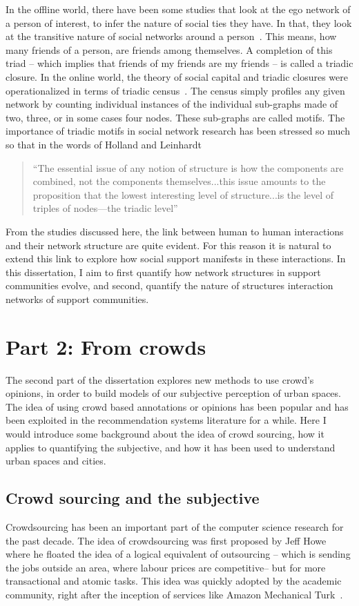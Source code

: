 In the offline world, there have been some studies that look at the ego network of a person of interest, to infer the nature of social ties they have. In that, they look at the transitive nature of social networks around a person~\cite{golden2009social,doi:10.1177/104649647100200201, lin2001social}. This means, how many friends of a person, are friends among themselves. A completion of this triad -- which implies that friends of my friends are my friends -- is called a triadic closure.
In the online world, the theory of social capital and triadic closures were operationalized in terms of triadic census~\cite{faust20077,faust2008triadic}. The census simply profiles any given network by counting individual instances of the individual sub-graphs made of two, three, or in some cases four nodes. These sub-graphs are called motifs.
The importance of triadic motifs in social network research has been stressed so much so that in the words of  Holland and Leinhardt~\cite{holland1977method} 
\begin{quote}
    ``The essential issue of any notion of structure is how the components are combined, not the components themselves...this issue amounts to the proposition that the lowest interesting level of structure...is the level of triples of nodes—the triadic level''
\end{quote}


From the studies discussed here, the link between human to human interactions and their network structure are quite evident. For this reason it is natural to extend this link to explore how social support manifests in these interactions. In this dissertation, I aim to first quantify how network structures in support communities evolve, and second, quantify the nature of structures interaction networks of support communities. 

\section{Part 2: From crowds}
The second part of the dissertation explores new methods to use crowd's opinions, in order to build models of our subjective perception of urban spaces. The idea of using crowd based annotations or opinions has been popular and has been exploited in the recommendation systems literature for a while. Here I would introduce some background about the idea of crowd sourcing, how it applies to quantifying the subjective, and how it has been used to understand urban spaces and cities. 

\subsection{Crowd sourcing and the subjective}
Crowdsourcing has been an important part of the computer science research for the past decade. The idea of crowdsourcing was first proposed by Jeff Howe~\cite{howe2006rise} where he floated the  idea of a logical equivalent of outsourcing -- which is sending the jobs outside an area, where labour prices are competitive-- but for more transactional and atomic tasks. This idea was quickly adopted by the academic community, right after the inception of services like Amazon Mechanical Turk~\cite{paolacci2010running}.


